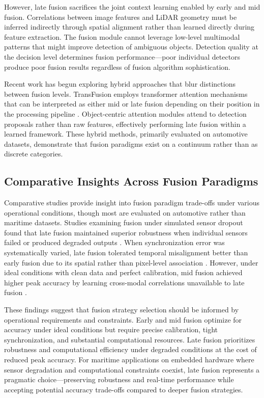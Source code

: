 \documentclass[../main.tex]{subfiles}
\begin{document}
However, late fusion sacrifices the joint context learning enabled by early and mid fusion. Correlations between image features and LiDAR geometry must be inferred indirectly through spatial alignment rather than learned directly during feature extraction. The fusion module cannot leverage low-level multimodal patterns that might improve detection of ambiguous objects. Detection quality at the decision level determines fusion performance—poor individual detectors produce poor fusion results regardless of fusion algorithm sophistication.

Recent work has begun exploring hybrid approaches that blur distinctions between fusion levels. TransFusion employs transformer attention mechanisms that can be interpreted as either mid or late fusion depending on their position in the processing pipeline \cite{chitta2023}. Object-centric attention modules attend to detection proposals rather than raw features, effectively performing late fusion within a learned framework. These hybrid methods, primarily evaluated on automotive datasets, demonstrate that fusion paradigms exist on a continuum rather than as discrete categories.

\subsection{Comparative Insights Across Fusion Paradigms}

Comparative studies provide insight into fusion paradigm trade-offs under various operational conditions, though most are evaluated on automotive rather than maritime datasets. Studies examining fusion under simulated sensor dropout found that late fusion maintained superior robustness when individual sensors failed or produced degraded outputs \cite{huang2024a, wang2020a}. When synchronization error was systematically varied, late fusion tolerated temporal misalignment better than early fusion due to its spatial rather than pixel-level association \cite{huang2024a}. However, under ideal conditions with clean data and perfect calibration, mid fusion achieved higher peak accuracy by learning cross-modal correlations unavailable to late fusion \cite{huang2024a}.

These findings suggest that fusion strategy selection should be informed by operational requirements and constraints. Early and mid fusion optimize for accuracy under ideal conditions but require precise calibration, tight synchronization, and substantial computational resources. Late fusion prioritizes robustness and computational efficiency under degraded conditions at the cost of reduced peak accuracy. For maritime applications on embedded hardware where sensor degradation and computational constraints coexist, late fusion represents a pragmatic choice—preserving robustness and real-time performance while accepting potential accuracy trade-offs compared to deeper fusion strategies.
\end{document}
